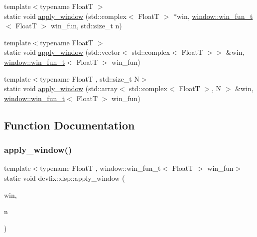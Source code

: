 \begin{DoxyCompactItemize}
\item 
{\footnotesize template$<$typename FloatT $>$ }\\static void \hyperlink{namespacedevfix_1_1dsp_a400e0dd8341bfbcfe42e60388c7a2494}{apply\+\_\+window} (std\+::complex$<$ FloatT $>$ $\ast$win, \hyperlink{structdevfix_1_1dsp_1_1window_ab2d2c0c5f5fca6dbcf91895115b69eac}{window\+::win\+\_\+fun\+\_\+t}$<$ FloatT $>$ win\+\_\+fun, std\+::size\+\_\+t n)
\item 
{\footnotesize template$<$typename FloatT $>$ }\\static void \hyperlink{namespacedevfix_1_1dsp_a7f5d2ade6feeeba107861b7040ee89b6}{apply\+\_\+window} (std\+::vector$<$ std\+::complex$<$ FloatT $>$$>$ \&win, \hyperlink{structdevfix_1_1dsp_1_1window_ab2d2c0c5f5fca6dbcf91895115b69eac}{window\+::win\+\_\+fun\+\_\+t}$<$ FloatT $>$ win\+\_\+fun)
\item 
{\footnotesize template$<$typename FloatT , std\+::size\+\_\+t N$>$ }\\static void \hyperlink{namespacedevfix_1_1dsp_aa05b8f98b6ec005c5c7e08efa0afb08a}{apply\+\_\+window} (std\+::array$<$ std\+::complex$<$ FloatT $>$, N $>$ \&win, \hyperlink{structdevfix_1_1dsp_1_1window_ab2d2c0c5f5fca6dbcf91895115b69eac}{window\+::win\+\_\+fun\+\_\+t}$<$ FloatT $>$ win\+\_\+fun)
\end{DoxyCompactItemize}


\subsection{Function Documentation}
\mbox{\label{namespacedevfix_1_1dsp_a45835752ed90577a53430b19eb80348c}} 
\subsubsection{\texorpdfstring{apply\+\_\+window()}{apply\_window()}\hspace{0.1cm}{\footnotesize\ttfamily [1/6]}}
{\footnotesize\ttfamily template$<$typename FloatT , window\+::win\+\_\+fun\+\_\+t$<$ Float\+T $>$ win\+\_\+fun$>$ \\
static void devfix\+::dsp\+::apply\+\_\+window (\begin{DoxyParamCaption}\item[{std\+::complex$<$ FloatT $>$ $\ast$}]{win,  }\item[{std\+::size\+\_\+t}]{n }\end{DoxyParamCaption})\hspace{0.3cm}{\ttfamily [static]}}


